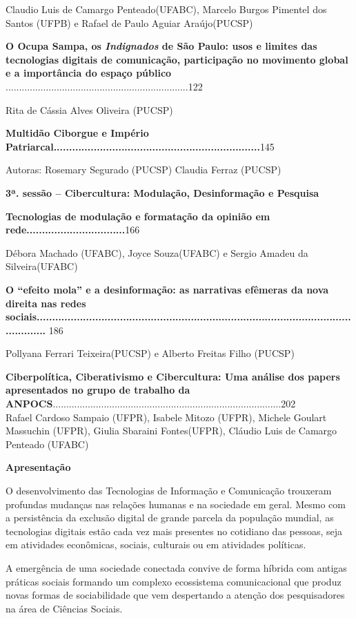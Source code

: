 Claudio Luis de Camargo Penteado(UFABC), Marcelo Burgos Pimentel dos
Santos (UFPB) e Rafael de Paulo Aguiar Araújo(PUCSP)

\textbf{O Ocupa Sampa, os \emph{Indignados} de São Paulo: usos e limites
das tecnologias digitais de comunicação, participação no movimento
global e a importância do espaço público}
....................................................................122

Rita de Cássia Alves Oliveira (PUCSP)

\textbf{Multidão Ciborgue e Império
Patriarcal...................................................................}145

Autoras: Rosemary Segurado (PUCSP) Claudia Ferraz (PUCSP)

\textbf{3ª. sessão -- Cibercultura: Modulação, Desinformação e Pesquisa}

\textbf{Tecnologias de modulação e formatação da opinião em
rede................................}166

Débora Machado (UFABC), Joyce Souza(UFABC) e Sergio Amadeu da
Silveira(UFABC)

\textbf{O ``efeito mola'' e a desinformação: as narrativas efêmeras da
nova direita nas redes
sociais...................................................................................................................}
186

Pollyana Ferrari Teixeira(PUCSP) e Alberto Freitas Filho (PUCSP)

\textbf{Ciberpolítica, Ciberativismo e Cibercultura: Uma análise dos
papers apresentados no grupo de trabalho da
ANPOCS}.....................................................................................202\\
Rafael Cardoso Sampaio (UFPR), Isabele Mitozo (UFPR), Michele Goulart
Massuchin (UFPR), Giulia Sbaraini Fontes(UFPR), Cláudio Luis de Camargo
Penteado (UFABC)

\textbf{Apresentação}

O desenvolvimento das Tecnologias de Informação e Comunicação trouxeram
profundas mudanças nas relações humanas e na sociedade em geral. Mesmo
com a persistência da exclusão digital de grande parcela da população
mundial, as tecnologias digitais estão cada vez mais presentes no
cotidiano das pessoas, seja em atividades econômicas, sociais, culturais
ou em atividades políticas.

A emergência de uma sociedade conectada convive de forma híbrida com
antigas práticas sociais formando um complexo ecossistema comunicacional
que produz novas formas de sociabilidade que vem despertando a atenção
dos pesquisadores na área de Ciências Sociais.

